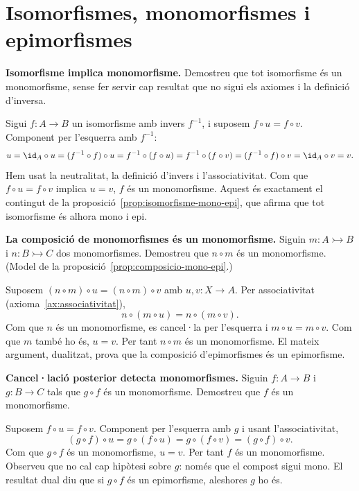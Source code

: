 \section{Isomorfismes, monomorfismes i epimorfismes}\label{prac:iso-mono-epi}

\begin{exercici}
\textbf{Isomorfisme implica monomorfisme.} Demostreu que tot isomorfisme és un monomorfisme, sense fer servir cap resultat que no sigui els axiomes i la definició d'inversa.
\end{exercici}
\begin{solucio}
Sigui \(f\colon A\to B\) un isomorfisme amb invers \(f^{-1}\), i suposem \(f\circ u=f\circ v\). Component per l'esquerra amb \(f^{-1}\):
\[
u=\id_A\circ u=(f^{-1}\circ f)\circ u=f^{-1}\circ(f\circ u)=f^{-1}\circ(f\circ v)=(f^{-1}\circ f)\circ v=\id_A\circ v=v.
\]
Hem usat la neutralitat, la definició d'invers i l'associativitat. Com que \(f\circ u=f\circ v\) implica \(u=v\), \(f\) és un monomorfisme. Aquest és exactament el contingut de la proposició~\ref{prop:isomorfisme-mono-epi}, que afirma que tot isomorfisme és alhora mono i epi.
\end{solucio}

\begin{exercici}
\textbf{La composició de monomorfismes és un monomorfisme.} Siguin \(m:A\rightarrowtail B\) i \(n:B\rightarrowtail C\) dos monomorfismes. Demostreu que \(n\circ m\) és un monomorfisme. (Model de la proposició~\ref{prop:composicio-mono-epi}.)
\end{exercici}
\begin{solucio}
Suposem \((n\circ m)\circ u=(n\circ m)\circ v\) amb \(u,v:X\to A\). Per associativitat (axioma~\ref{ax:associativitat}),
\[
n\circ(m\circ u)=n\circ(m\circ v).
\]
Com que \(n\) és un monomorfisme, es cancel·la per l'esquerra i \(m\circ u=m\circ v\). Com que \(m\) també ho és, \(u=v\). Per tant \(n\circ m\) és un monomorfisme. El mateix argument, dualitzat, prova que la composició d'epimorfismes és un epimorfisme.
\end{solucio}

\begin{exercici}
\textbf{Cancel·lació posterior detecta monomorfismes.} Siguin \(f:A\to B\) i \(g:B\to C\) tals que \(g\circ f\) és un monomorfisme. Demostreu que \(f\) és un monomorfisme.
\end{exercici}
\begin{solucio}
Suposem \(f\circ u=f\circ v\). Component per l'esquerra amb \(g\) i usant l'associativitat,
\[
(g\circ f)\circ u=g\circ(f\circ u)=g\circ(f\circ v)=(g\circ f)\circ v.
\]
Com que \(g\circ f\) és un monomorfisme, \(u=v\). Per tant \(f\) és un monomorfisme. Observeu que no cal cap hipòtesi sobre \(g\): només que el compost sigui mono. El resultat dual diu que si \(g\circ f\) és un epimorfisme, aleshores \(g\) ho és.
\end{solucio}

